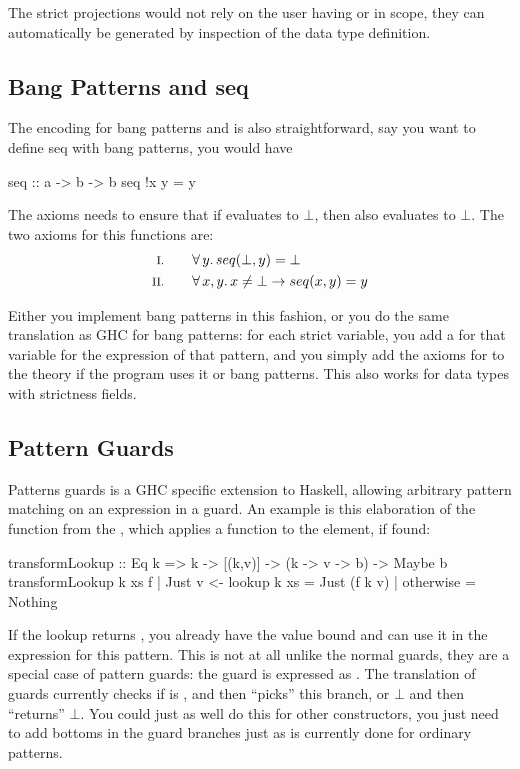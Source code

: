 The strict projections would not rely on the user having  or
 in scope, they can automatically be generated by
inspection of the data type definition.

\subsection{Bang Patterns and seq}

The encoding for bang patterns and  is also straightforward,
say you want to define seq with bang patterns, you would have

\begin{code}
seq :: a -> b -> b
seq !x y = y
\end{code}

The axioms needs to ensure that if  evaluates to $\bot$, then
 also evaluates to $\bot$. The two axioms for this functions are:
\begin{align*}
\rom{1} \qquad & \fa{y}    seq(\bot,y) \eq \bot \\
\rom{2} \qquad & \faa{x}{y} x \neq \bot \rightarrow seq(x,y) \eq y
\end{align*}

Either you implement bang patterns in this fashion, or you do the same
translation as GHC for bang patterns: for each strict variable, you
add a  for that variable for the expression of that pattern,
and you simply add the axioms for  to the theory if the
program uses it or bang patterns. This also works for data types with
strictness fields.

\subsection{Pattern Guards}

Patterns guards is a GHC specific extension to Haskell, allowing
arbitrary pattern matching on an expression in a guard. An example is
this elaboration of the  function from the ,
which applies a function to the element, if found:

\begin{code}
transformLookup :: Eq k => k -> [(k,v)] -> (k -> v -> b) -> Maybe b
transformLookup k xs f | Just v <- lookup k xs = Just (f k v)
                       | otherwise             = Nothing
\end{code}

\noindent
If the lookup returns , you already have the value 
bound and can use it in the expression for this pattern. This is not
at all unlike the normal guards, they are a special case of pattern
guards: the guard  is expressed as
. The translation of guards currently checks if
 is , and then ``picks'' this branch, or $\bot$ and
then ``returns'' $\bot$. You could just as well do this for other
constructors, you just need to add bottoms in the guard branches just
as is currently done for ordinary patterns.

